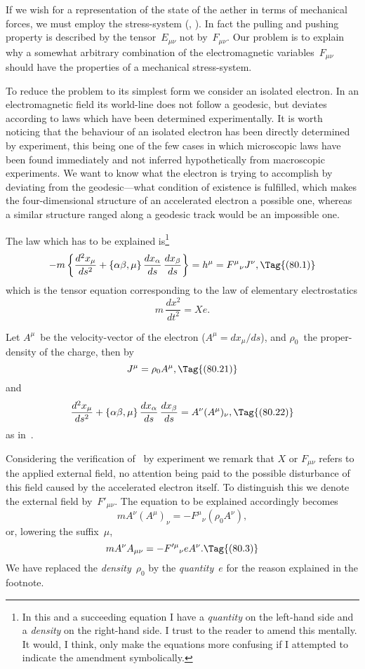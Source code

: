 \documentclass[12pt]{book}
\begin{document}
If we wish for a representation of the state of the aether in terms of
mechanical forces, we must employ the stress-system (, ). In fact
the pulling and pushing property is described by the tensor~$E_{\mu\nu}$ not by~$F_{\mu\nu}$.
Our problem is to explain why a somewhat arbitrary combination of the
electromagnetic variables~$F_{\mu\nu}$ should have the properties of a mechanical
stress-system.

To reduce the problem to its simplest form we consider an isolated electron.
%
%
In an electromagnetic field its world-line does not follow a geodesic, but
deviates according to laws which have been determined experimentally. It is
worth noticing that the behaviour of an isolated electron has been directly
determined by experiment, this being one of the few cases in which microscopic
laws have been found immediately and not inferred hypothetically from
macroscopic experiments. We want to know what the electron is trying to
accomplish by deviating from the geodesic---what condition of existence is
fulfilled, which makes the four-dimensional structure of an accelerated electron
a possible one, whereas a similar structure ranged along a geodesic track would
be an impossible one.

The law which has to be explained is\footnote
  {In this and a succeeding equation I have a \emph{quantity} on the left-hand side and a \emph{density} on
  the right-hand side. I trust to the reader to amend this mentally. It would, I think, only make
  the equations more confusing if I attempted to indicate the amendment symbolically.}
\[
-m \left\{\frac{d^{2}x_{\mu}}{ds^{2}}
+ \{\alpha\beta, \mu\}\, \frac{dx_{\alpha}}{ds}\, \frac{dx_{\beta}}{ds}\right\}
= h^{\mu} = {F^{\mu}}_{\nu} J^{\nu},
\Tag{(80.1)}
\]
which is the tensor equation corresponding to the law of elementary electrostatics
\[
m\, \frac{dx^{2}}{dt^{2}} = Xe.
\]

Let $A^{\mu}$~be the velocity-vector of the electron ($A^{\mu} = dx_{\mu}/ds$), and $\rho_{0}$~the
proper-density of the charge, then by~
\[
J^{\mu} = \rho_{0} A^{\mu},
\Tag{(80.21)}
\]
and
\[
\frac{d^{2}x_{\mu}}{ds^{2}}
+ \{\alpha\beta, \mu\}\, \frac{dx_{\alpha}}{ds}\, \frac{dx_{\beta}}{ds}
= A^{\nu} (A^{\mu})_{\nu},
\Tag{(80.22)}
\]
as in~.

Considering the verification of~ by experiment we remark that $X$ or
$F_{\mu\nu}$ refers to the applied external field, no attention being paid to the possible
disturbance of this field caused by the accelerated electron itself. To distinguish
this we denote the external field by~${F'}_{\mu\nu}$. The equation to be explained
accordingly becomes
\[
mA^{\nu}(A^{\mu})_{\nu} = -{F^{\mu}}_{\nu} (\rho_{0} A^{\nu}),
\]
or, lowering the suffix~$\mu$,
\[
mA^{\nu} A_{\mu\nu} = -{F'^{\mu}}_{\nu} eA^{\nu}.
\Tag{(80.3)}
\]
We have replaced the \emph{density}~$\rho_{0}$ by the \emph{quantity}~$e$ for the reason explained in
the footnote.
\end{document}
